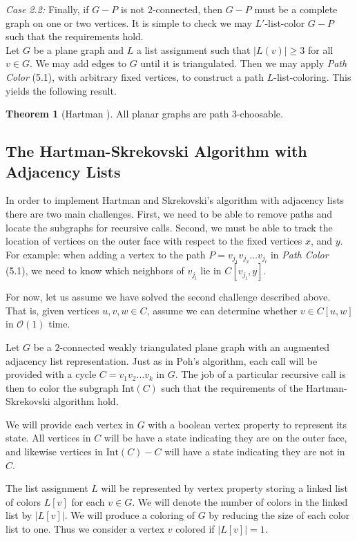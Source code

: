 \documentclass[letterpaper, 12pt]{article}
\theoremstyle{definition}
\theoremstyle{definition}
\theoremstyle{thm}
\newtheorem{theorem}{Theorem}[section]
\theoremstyle{definition}
\begin{document}
\textit{Case 2.2:} Finally, if $G-P$ is not $2$-connected, then $G-P$ must be a
complete graph on one or two vertices. It is simple to check we may
$L'$-list-color $G-P$ such that the requirements hold.\\

Let $G$ be a plane graph and $L$ a list assignment such that $|L(v)|\ge 3$
for all $v\in G$. We may add edges to $G$ until it is triangulated. Then
we may apply \textit{Path Color} (5.1), with arbitrary fixed vertices, to
construct a path $L$-list-coloring. This yields the following result.

\begin{theorem}[Hartman \cite{hartman}]
All planar graphs are path $3$-choosable.
\end{theorem}

\subsection{The Hartman-Skrekovski Algorithm with Adjacency Lists}

In order to implement Hartman and Skrekovski's algorithm with adjacency lists
there are two main challenges. First, we need to be able to remove paths and
locate the subgraphs for recursive calls. Second, we must be able to track the
location of vertices on the outer face with respect to the fixed vertices
$x$, and $y$. For example: when adding a vertex to the path
$P=v_{j_1}v_{j_2}\ldots v_{j_l}$ in \textit{Path Color} (5.1), we need to know
which neighbors of $v_{j_l}$ lie in $C[v_{j_l},y]$.

For now, let us assume we have solved the second challenge described above. That
is, given vertices $u,v,w\in C$, assume we can determine whether $v\in C[u,w]$
in $\mathcal{O}(1)$ time.

Let $G$ be a $2$-connected weakly triangulated plane graph with an augmented
adjacency list representation. Just as in Poh's algorithm, each call will be
provided with a cycle $C=v_1v_2\ldots v_k$ in $G$. The
job of a particular recursive call is then to color the subgraph $\text{Int}(C)$
such that the requirements of the Hartman-Skrekovski algorithm hold.

We will provide each vertex in $G$ with a boolean vertex property to represent
its state. All vertices in $C$ will be have a state indicating they are on the
outer face, and likewise vertices in $\text{Int}(C)-C$ will have a state
indicating they are not in $C$.

The list assignment $L$ will be represented by vertex property storing a linked
list of colors $L[v]$ for each $v\in G$. We will denote the number of colors
in the linked list by $|L[v]|$. We will produce a coloring of $G$ by reducing
the size of each color list to one. Thus we consider a vertex $v$
colored if $|L[v]|=1$.
\end{document}
